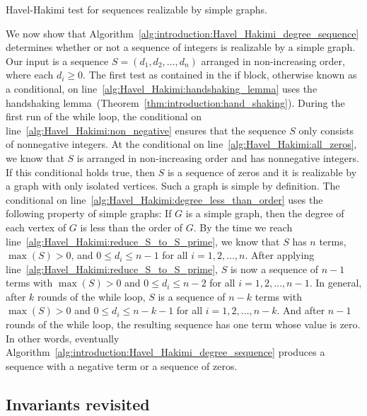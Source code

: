 \begin{algorithm}[!htbp]

\caption{Havel-Hakimi test for sequences realizable by simple graphs.}
\label{alg:introduction:Havel_Hakimi_degree_sequence}
\end{algorithm}

We now show that
Algorithm~\ref{alg:introduction:Havel_Hakimi_degree_sequence}
determines whether or not a sequence of integers is realizable by a
simple graph. Our input is a sequence $S = (d_1, d_2, \dots, d_n)$
arranged in non-increasing order, where each $d_i \geq 0$. The first
test as contained in the if block, otherwise known as a
conditional, on line~\ref{alg:Havel_Hakimi:handshaking_lemma} uses the
handshaking
lemma~(Theorem~\ref{thm:introduction:hand_shaking}). During the first
run of the while loop, the conditional on
line~\ref{alg:Havel_Hakimi:non_negative} ensures that the sequence $S$
only consists of nonnegative integers. At the conditional on
line~\ref{alg:Havel_Hakimi:all_zeros}, we know that $S$ is arranged in
non-increasing order and has nonnegative integers. If this
conditional holds true, then $S$ is a sequence of zeros and it is
realizable by a graph with only isolated vertices. Such a graph is
simple by definition. The conditional on
line~\ref{alg:Havel_Hakimi:degree_less_than_order} uses the following
property of simple graphs: If $G$ is a simple graph, then the degree
of each vertex of $G$ is less than the order of $G$. By the time we
reach line~\ref{alg:Havel_Hakimi:reduce_S_to_S_prime}, we know that
$S$ has $n$ terms, $\max(S) > 0$, and $0 \leq d_i \leq n - 1$ for all
$i = 1, 2, \dots, n$. After applying
line~\ref{alg:Havel_Hakimi:reduce_S_to_S_prime}, $S$ is now a sequence
of $n - 1$ terms with $\max(S) > 0$ and $0 \leq d_i \leq n - 2$ for all
$i = 1, 2, \dots, n-1$. In general, after $k$ rounds of the while
loop, $S$ is a sequence of $n - k$ terms with $\max(S) > 0$ and
$0 \leq d_i \leq n - k - 1$ for all $i = 1, 2, \dots, n-k$. And after
$n - 1$ rounds of the while loop, the resulting sequence has one term
whose value is zero. In other words, eventually
Algorithm~\ref{alg:introduction:Havel_Hakimi_degree_sequence} produces
a sequence with a negative term or a sequence of zeros.



\subsection{Invariants revisited}

